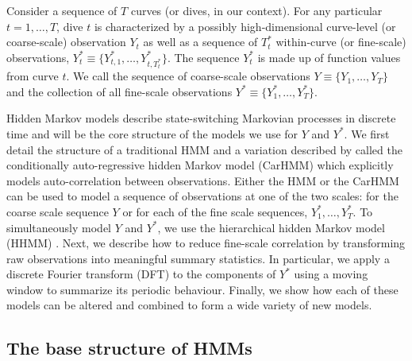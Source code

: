 
Consider a sequence of $T$ curves (or dives, in our context). For any particular $t = 1,
\ldots,T$, dive $t$ is characterized by a possibly high-dimensional curve-level (or coarse-scale) observation $Y_t$ as well as a sequence of $T^*_t$ within-curve (or fine-scale) observations, $Y^*_{t} \equiv \big\{Y^*_{t,1},\ldots,Y^*_{t,T^*_t}\big\}$. The sequence $Y^*_{t}$ is made up of function values from curve $t$. We call the sequence of coarse-scale observations $Y \equiv \big\{Y_1, \ldots, Y_T\big\}$ and the collection of all fine-scale observations $Y^* \equiv \big\{Y^*_1,\ldots,Y^*_T \big\}$.

Hidden Markov models describe state-switching Markovian processes in discrete time and will be the core structure of the models we use for $Y$ and $Y^*$. We first detail the structure of a traditional HMM and a variation described by \cite{Lawler:2019} called the conditionally auto-regressive hidden Markov model (CarHMM) which explicitly models auto-correlation between observations. Either the HMM or the CarHMM can be used to model a sequence of observations at one of the two scales: for the coarse scale sequence $Y$ or for each of the fine scale sequences, $Y_1^*,\ldots, Y_T^*$. To simultaneously model $Y$ and $Y^*$, we use the hierarchical hidden Markov model (HHMM) \citep{Barajas:2017,Adam:2019}.
Next, we describe how to reduce fine-scale correlation by transforming raw observations into meaningful summary statistics. In particular, we apply a discrete Fourier transform (DFT) to the components of $Y^*$ using a moving window to summarize its periodic behaviour. Finally, we show how each of these models can be altered and combined to form a wide variety of new models.

\subsection{The base structure of HMMs}

